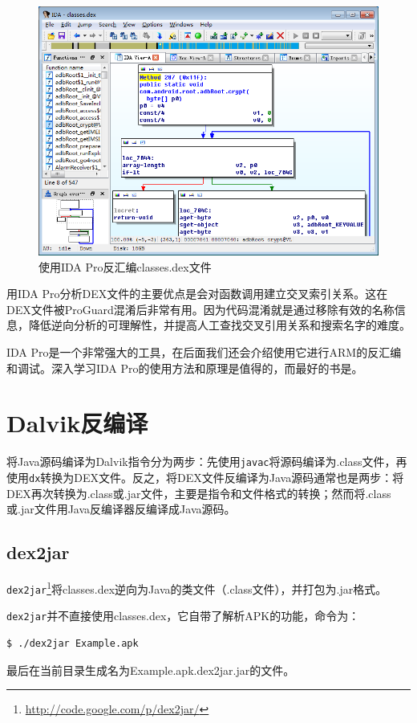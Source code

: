 \begin{figure}[htbp]
  \centering
  \includegraphics[width=14cm]{image/ida-dex.png}
  \caption{使用IDA Pro反汇编classes.dex文件}
  \label{Fig:ida-dex}
\end{figure}

用IDA Pro分析DEX文件的主要优点是会对函数调用建立交叉索引关系。这在DEX文件被ProGuard混淆后非常有用。因为代码混淆就是通过移除有效的名称信息，降低逆向分析的可理解性，并提高人工查找交叉引用关系和搜索名字的难度。

IDA Pro是一个非常强大的工具，在后面我们还会介绍使用它进行ARM的反汇编和调试。深入学习IDA Pro的使用方法和原理是值得的，而最好的书是\cite{ida_pro}。

\section{Dalvik反编译}
将Java源码编译为Dalvik指令分为两步：先使用\lstinline!javac!将源码编译为.class文件，再使用\lstinline!dx!转换为DEX文件。反之，将DEX文件反编译为Java源码通常也是两步：将DEX再次转换为.class或.jar文件，主要是指令和文件格式的转换；然而将.class或.jar文件用Java反编译器反编译成Java源码。

\subsection{dex2jar}
\lstinline!dex2jar!\footnote{\url{http://code.google.com/p/dex2jar/}}将classes.dex逆向为Java的类文件（.class文件），并打包为.jar格式。

\lstinline!dex2jar!并不直接使用classes.dex，它自带了解析APK的功能，命令为：
\begin{lstlisting}[language=bash, numbers=none]
 $ ./dex2jar Example.apk
\end{lstlisting}
最后在当前目录生成名为Example.apk.dex2jar.jar的文件。

